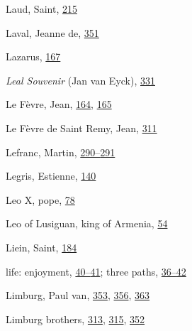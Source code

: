 Laud, Saint,
\protect\hyperlink{14_Chapter_Seven__THE_PIOUS_PERSONA.xhtmlux5cux23page_215}{215}

Laval, Jeanne de,
\protect\hyperlink{21_Chapter_Thirteen__IMAGE_AND_WORD.xhtmlux5cux23page_351}{351}

Lazarus,
\protect\hyperlink{12_Chapter_Five__THE_VISION_OF_DEAT.xhtmlux5cux23page_167}{167}

\emph{Leal Souvenir} (Jan van Eyck),
\protect\hyperlink{21_Chapter_Thirteen__IMAGE_AND_WORD.xhtmlux5cux23page_331}{331}

Le Fèvre, Jean,
\protect\hyperlink{12_Chapter_Five__THE_VISION_OF_DEAT.xhtmlux5cux23page_164}{164},
\protect\hyperlink{12_Chapter_Five__THE_VISION_OF_DEAT.xhtmlux5cux23page_165}{165}

Le Fèvre de Saint Remy, Jean,
\protect\hyperlink{20_ILLUSTRATIONS_FOLLOW_PAGE.xhtmlux5cux23page_311}{311}

Lefranc, Martin,
\protect\hyperlink{18_Chapter_Eleven__THE_FORMS_OF_THO.xhtmlux5cux23page_290}{290--}\protect\hyperlink{18_Chapter_Eleven__THE_FORMS_OF_THO.xhtmlux5cux23page_291}{291}

Legris, Estienne,
\protect\hyperlink{11_Chapter_Four__THE_FORMS_OF_LOVE.xhtmlux5cux23page_140}{140}

Leo X, pope,
\protect\hyperlink{10_Chapter_Three__THE_HEROIC_DREAM.xhtmlux5cux23page_78}{78}

Leo of Lusiguan, king of Armenia,
\protect\hyperlink{09_Chapter_Two__THE_CRAVING_FOR_A_M.xhtmlux5cux23page_54}{54}

Liein, Saint,
\protect\hyperlink{13_Chapter_Six__THE_DEPICTION_OF_TH.xhtmlux5cux23page_184}{184}

life: enjoyment,
\protect\hyperlink{09_Chapter_Two__THE_CRAVING_FOR_A_M.xhtmlux5cux23page_40}{40--}\protect\hyperlink{09_Chapter_Two__THE_CRAVING_FOR_A_M.xhtmlux5cux23page_41}{41};
three paths,
\protect\hyperlink{09_Chapter_Two__THE_CRAVING_FOR_A_M.xhtmlux5cux23page_36}{36--}\protect\hyperlink{09_Chapter_Two__THE_CRAVING_FOR_A_M.xhtmlux5cux23page_42}{42}

Limburg, Paul van,
\protect\hyperlink{21_Chapter_Thirteen__IMAGE_AND_WORD.xhtmlux5cux23page_353}{353},
\protect\hyperlink{21_Chapter_Thirteen__IMAGE_AND_WORD.xhtmlux5cux23page_356}{356},
\protect\hyperlink{21_Chapter_Thirteen__IMAGE_AND_WORD.xhtmlux5cux23page_363}{363}

Limburg brothers,
\protect\hyperlink{20_ILLUSTRATIONS_FOLLOW_PAGE.xhtmlux5cux23page_313}{313},
\protect\hyperlink{20_ILLUSTRATIONS_FOLLOW_PAGE.xhtmlux5cux23page_315}{315},
\protect\hyperlink{21_Chapter_Thirteen__IMAGE_AND_WORD.xhtmlux5cux23page_352}{352}


